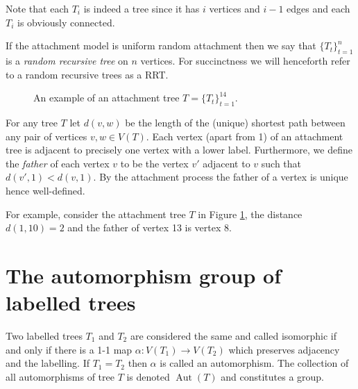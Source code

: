 \documentclass[oneside]{book} %
\theoremstyle{definition}
\numberwithin{equation}{section}
\DeclareMathOperator{\Aut}{Aut} %
\begin{document}
Note that each $T_i$ is indeed a tree since it has $i$ vertices and $i-1$ edges and each $T_i$ is obviously connected. 

If the attachment model is uniform random attachment then we say that $\{T_t\}_{t=1}^{n}$ is a \emph{ 
random recursive tree} on $n$ vertices. For succinctness we will henceforth refer to a random recursive trees as a RRT.  
\begin{figure}[ht]
\centering
{}
\caption{An example of an attachment tree $T = \{T_t\}_{t=1}^{14}$.}\label{fig1}
\end{figure}

For any tree $T$ let  $d(v,w)$ be the length of the (unique) shortest path between any pair of vertices $v,w \in V(T)$. 
Each vertex (apart from 1) of an attachment tree is adjacent to precisely one vertex with a lower label. Furthermore, we 
define the \emph{father} of each vertex $v$ to be the vertex $v'$ adjacent to $v$ such that $d(v',1)< d(v,1)$. By the attachment 
process the father of a vertex is unique hence well-defined.

For example, consider the attachment tree $T$ in Figure \ref{fig1}, the distance $d(1,10) = 2$ and the father of vertex 13 is vertex 8.

\section{The automorphism group of labelled trees}\label{sec:yo}
Two labelled trees $T_{1}$ and $T_2$ are considered the same and called isomorphic if and only if there is a 1-1 map $\alpha: V(T_1) \rightarrow V(T_2)$ which preserves adjacency and the labelling.  If $T_1 = T_2$ then $\alpha$ is called an automorphism.  The collection of all automorphisms of tree $T$ is  denoted $\Aut(T)$ and constitutes a group.
\end{document}

